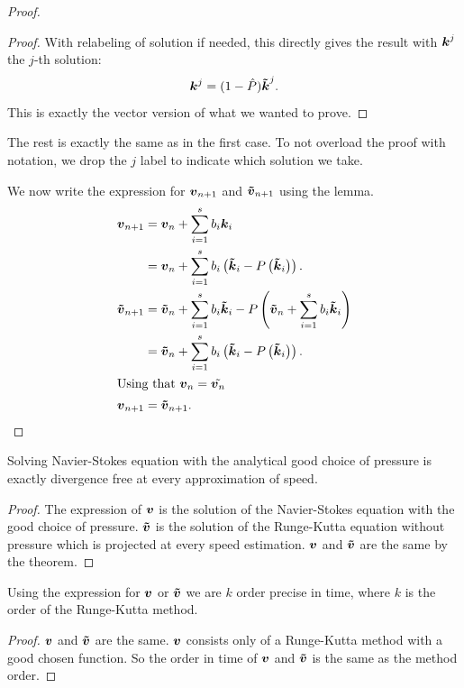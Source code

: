 \begin{proof}
\begin{proof}
With relabeling of solution if needed, this directly gives the result with ${\boldsymbol {k}}^{j}$ the $j$-th solution:
\begin{equation}
{\boldsymbol {k}}^{j}=(1-\hat{P}){\boldsymbol {\tilde{k}}}^{j}.
\end{equation}
This is exactly the vector version of what we wanted to prove.
\end{proof}

The rest is exactly the same as in the first case.
To not overload the proof with notation, we drop the $j$ label to indicate which solution we take.

We now write the expression for ${\boldsymbol {v}}_{n+1}$ and ${\boldsymbol {\tilde{v}}}_{n+1}$ using the lemma.
\begin{align*}
{\boldsymbol {v}}_{n+1}&={\boldsymbol {v}}_{n}+\sum_{i=1}^{s}b_{i}{\boldsymbol {k}}_{i}\\
&={\boldsymbol {v}}_{n}+\sum_{i=1}^{s}b_{i}\left({\boldsymbol {\tilde{k}}}_{i}-P\left({\boldsymbol {\tilde{k}}}_{i}\right)\right).\\
{\boldsymbol {\tilde{v}}}_{n+1}&={\boldsymbol {\tilde{v}}}_{n}+\sum_{i=1}^{s}b_{i}{\boldsymbol {\tilde{k}}}_{i}-P\left({\boldsymbol {\tilde{v}}}_{n}+\sum_{i=1}^{s}b_{i}{\boldsymbol {\tilde{k}}}_{i}\right)\\
&={\boldsymbol {\tilde{v}}}_{n}+\sum_{i=1}^{s}b_{i}\left({\boldsymbol {\tilde{k}}}_{i}-P\left({\boldsymbol {\tilde{k}}}_{i}\right)\right).\\
\intertext{Using that ${\boldsymbol {v}}_{n}=\tilde{{\boldsymbol {v}}_{n}}$}
{\boldsymbol {v}}_{n+1}&={\boldsymbol {\tilde{v}}}_{n+1}.
\end{align*}

\end{proof}

\begin{corollary}
Solving Navier-Stokes equation with the analytical good choice of pressure is exactly divergence free at every approximation of speed.
\end{corollary}
\begin{proof}
  The expression of ${\boldsymbol {v}}$ is the solution of the Navier-Stokes equation with the good choice of pressure.
  ${\boldsymbol {\tilde{v}}}$ is the solution of the Runge-Kutta equation without pressure which is projected at every speed estimation.
  ${\boldsymbol {v}}$ and ${\boldsymbol {\tilde{v}}}$ are the same by the theorem.
\end{proof}

\begin{corollary}
  Using the expression for ${\boldsymbol {v}}$ or ${\boldsymbol {\tilde{v}}}$ we are $k$ order precise in time, where $k$ is the order of the Runge-Kutta method.
\end{corollary}
\begin{proof}
  ${\boldsymbol {v}}$ and ${\boldsymbol {\tilde{v}}}$ are the same.
  ${\boldsymbol {v}}$ consists only of a Runge-Kutta method with a good chosen function.
  So the order in time of ${\boldsymbol {v}}$ and ${\boldsymbol {\tilde{v}}}$ is the same as the method order.
\end{proof}


